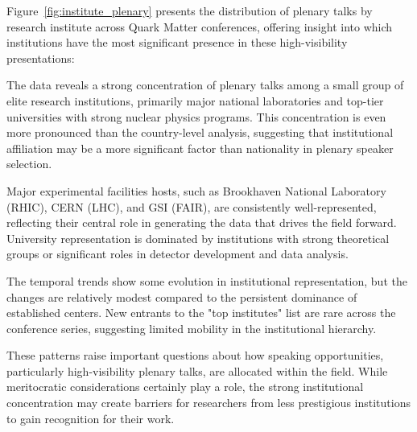 \documentclass[a4paper,11pt]{article}
\begin{document}
Figure~\ref{fig:institute_plenary} presents the distribution of plenary talks by research institute across Quark Matter conferences, offering insight into which institutions have the most significant presence in these high-visibility presentations:

The data reveals a strong concentration of plenary talks among a small group of elite research institutions, primarily major national laboratories and top-tier universities with strong nuclear physics programs. This concentration is even more pronounced than the country-level analysis, suggesting that institutional affiliation may be a more significant factor than nationality in plenary speaker selection.

Major experimental facilities hosts, such as Brookhaven National Laboratory (RHIC), CERN (LHC), and GSI (FAIR), are consistently well-represented, reflecting their central role in generating the data that drives the field forward. University representation is dominated by institutions with strong theoretical groups or significant roles in detector development and data analysis.

The temporal trends show some evolution in institutional representation, but the changes are relatively modest compared to the persistent dominance of established centers. New entrants to the "top institutes" list are rare across the conference series, suggesting limited mobility in the institutional hierarchy.

These patterns raise important questions about how speaking opportunities, particularly high-visibility plenary talks, are allocated within the field. While meritocratic considerations certainly play a role, the strong institutional concentration may create barriers for researchers from less prestigious institutions to gain recognition for their work.
\end{document}
